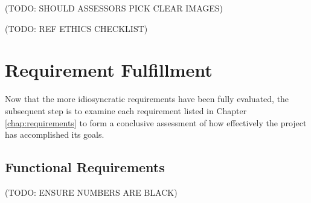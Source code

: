 \documentclass{l4proj}
\begin{document}
(TODO: SHOULD ASSESSORS PICK CLEAR IMAGES)

(TODO: REF ETHICS CHECKLIST)


\section{Requirement Fulfillment}
Now that the more idiosyncratic requirements have been fully evaluated, the subsequent step is to examine each requirement listed in Chapter \ref{chap:requirements} to form a conclusive assessment of how effectively the project has accomplished its goals.

\subsection{Functional Requirements}
(TODO: ENSURE NUMBERS ARE BLACK)
\end{document}
